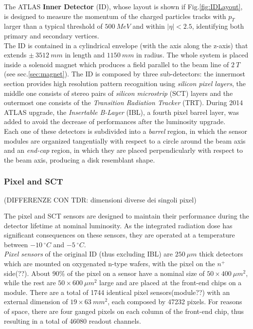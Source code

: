 \documentclass[a4paper,twoside,12pt]{article}
\begin{document}
The ATLAS \textbf{Inner Detector} (ID), whose layout is shown if Fig.\ref{fig:IDLayout}, is designed to measure the momentum of the
charged particles tracks with $p_{T}$ larger than a typical threshold of $500\ MeV$ and 
within $|\eta| < 2.5$, identifying both primary and secondary vertices\cite{Aad:2008zzm}. \\

The ID is contained in a cylindrical envelope (with the axis along the z-axis) that extends
$\pm\ 3512\ mm$ in length and $1150\ mm$ in radius. The whole system is placed inside
a solenoid magnet which produces a field parallel to the beam line of $2\ T$(see sec.\ref{sec:magnet}). The ID is composed by three sub-detectors: the innermost section provides
high resolution pattern recognition using \textit{silicon pixel layers}, the middle one consists of stereo pairs of \textit{silicon microstrip} (SCT) layers and the outermost one consists of the \textit{Transition Radiation Tracker} (TRT). During 2014 ATLAS upgrade, the \textit{Insertable B-Layer} (IBL), a fourth pixel barrel layer, was added to avoid the decrease of performances after the luminosity upgrade. \\

Each one of these detectors is subdivided into a \textit{barrel} region, in which the sensor modules 
are organized tangentially with respect to a circle around the beam axis and an \textit{end-cap} region, in which they are placed perpendicularly with respect to the beam axis, producing
a disk resemblant shape.

\subsubsection*{Pixel and SCT} (DIFFERENZE CON TDR: dimensioni diverse dei singoli pixel)

The pixel and SCT sensors are designed to maintain their performance during the detector
lifetime at nominal luminosity\cite{Aad:2008zzm}. As the integrated radiation dose has significant consequences
on these sensors, they are operated at a temperature between $-10\ ^{\circ}C$ and $-5\ ^{\circ}C$.\\

\textit{Pixel sensors} of the original ID (thus excluding IBL) are $250\ \mu m$ thick detectors which are mounted on oxygenated n-type wafers, with the pixel on the $n^+$ side(??). About 90\% of the pixel on a sensor have a nominal 
size of $50 \times 400\ \mu m^2$, while the rest are $50 \times 600\ \mu m^2$ large and are placed
at the front-end chips on a module. There are a total of 1744 identical pixel sensors(module??) with an external dimension of $19 \times 63\ mm^2$, each composed by 47232 pixels. For reasons of space, there are four ganged pixels on each column of the front-end chip, thus resulting in a total of 46080 readout channels. \\
\end{document}
